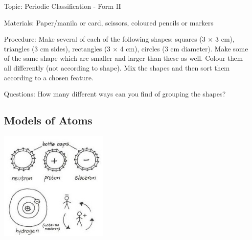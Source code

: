 \begin{multicols}{2}
\begin{description*}
\item[Topic:]{Periodic Classification - Form II}
\item[Materials:]{Paper/manila or card, scissors, coloured pencils or markers}
\item[Procedure:]{Make several of each of the following
shapes: squares (3 $\times$ 3 cm), triangles (3 cm sides),
rectangles (3 $\times$ 4 cm), circles (3 cm diameter). Make some of the same shape which are smaller and larger than these as well. Colour them all differently (not according to shape).
Mix the shapes and then sort them according to
a chosen feature. }
\item[Questions:]{How many different ways can
you find of grouping the shapes?}
\end{description*}

\subsection{Models of Atoms}

\begin{center}
\includegraphics[width=0.4\textwidth]{./img/vso/atom-model.jpg}
\end{center}


\end{multicols}
